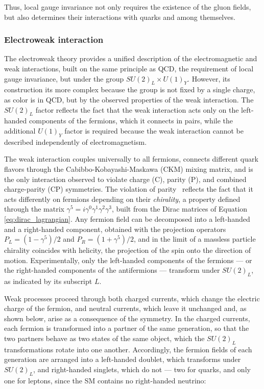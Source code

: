 Thus, local gauge invariance not only requires the existence of the gluon fields, but also determines their interactions with quarks and among themselves.



\subsubsection{Electroweak interaction}
%
The electroweak theory provides a unified description of the electromagnetic and weak interactions, built on the same principle as QCD, the requirement of local gauge invariance, but under the group $SU(2)_L \times U(1)_Y$. However, its construction its more complex because the group is not fixed by a single charge, as color is in QCD, but by the observed properties of the weak interaction. The $SU(2)_L$ factor reflects the fact that the weak interaction acts only on the left-handed components of the fermions, which it connects in pairs, while the additional $U(1)_Y$ factor is required because the weak interaction cannot be described independently of electromagnetism.

The weak interaction couples universally to all fermions, connects different quark flavors through the Cabibbo-Kobayashi-Maskawa (CKM) mixing matrix, and is the only interaction observed to violate charge (C), parity (P), and combined charge-parity (CP) symmetries. The violation of parity~\cite{Lee:1956qn,Wu:1957my} reflects the fact that it acts differently on fermions depending on their \textit{chirality}, a property defined through the matrix $\gamma^5 = i\gamma^0\gamma^1\gamma^2\gamma^3$, built from the Dirac matrices of Equation \ref{eq:dirac_lagrangian}. Any fermion field can be decomposed into a left-handed and a right-handed component, obtained with the projection operators $P_L = (1-\gamma^5)/2$ and $P_R = (1+\gamma^5)/2$, and in the limit of a massless particle chirality coincides with helicity, the projection of the spin onto the direction of motion. Experimentally, only the left-handed components of the fermions — or the right-handed components of the antifermions — transform under $SU(2)_L$, as indicated by its subscript $L$. 

Weak processes proceed through both charged currents, which change the electric charge of the fermion, and neutral currents, which leave it unchanged and, as shown below, arise as a consequence of the symmetry. In the charged currents, each fermion is transformed into a partner of the same generation, so that the two partners behave as two states of the same object, which the $SU(2)_L$ transformations rotate into one another. Accordingly, the fermion fields of each generation are arranged into a left-handed doublet, which transforms under $SU(2)_L$, and right-handed singlets, which do not — two for quarks, and only one for leptons, since the SM contains no right-handed neutrino:


